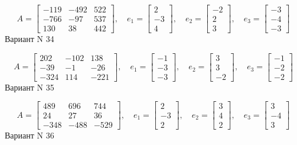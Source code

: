 \documentclass[11pt]{report}
\begin{document}
$$A = \left[\begin{matrix}-119 & -492 & 522\\-766 & -97 & 537\\130 & 38 & 442\end{matrix}\right],\quad e_1 = \left[\begin{matrix}2\\-3\\4\end{matrix}\right],\quad e_2 = \left[\begin{matrix}-2\\2\\3\end{matrix}\right],\quad e_3 = \left[\begin{matrix}-3\\-4\\-3\end{matrix}\right]$$Вариант N 34

$$A = \left[\begin{matrix}202 & -102 & 138\\-39 & -1 & -26\\-324 & 114 & -221\end{matrix}\right],\quad e_1 = \left[\begin{matrix}-1\\-3\\-3\end{matrix}\right],\quad e_2 = \left[\begin{matrix}3\\3\\-2\end{matrix}\right],\quad e_3 = \left[\begin{matrix}-1\\-2\\-2\end{matrix}\right]$$Вариант N 35

$$A = \left[\begin{matrix}489 & 696 & 744\\24 & 27 & 36\\-348 & -488 & -529\end{matrix}\right],\quad e_1 = \left[\begin{matrix}2\\-3\\2\end{matrix}\right],\quad e_2 = \left[\begin{matrix}3\\4\\2\end{matrix}\right],\quad e_3 = \left[\begin{matrix}3\\-4\\3\end{matrix}\right]$$Вариант N 36
\end{document}
